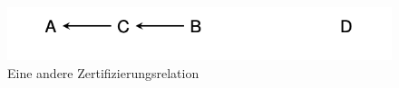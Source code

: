 \begin{figure}
  \centering
  \includegraphics[width=.6\textwidth]{res/zertifikate-2.png}
  \caption{Eine andere Zertifizierungsrelation}
  \label{fig:zertifikate2}
\end{figure}